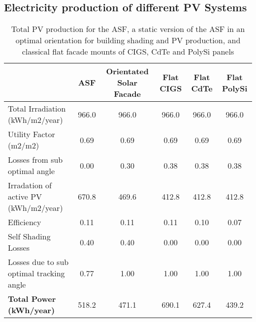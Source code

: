 

\subsection{Electricity production of different PV Systems}
\begin{landscape}
\begin{table}
\begin{tabular}{lccccc}
\hline
                                         &  ASF & Orientated Solar Facade & Flat  CIGS & Flat  CdTe & Flat  PolySi \\
\hline
Total Irradiation (kWh/m2/year)          & 966.0      & 966.0      & 966.0             & 966.0             & 966.0               \\
Utility Factor (m2/m2)                   & 0.69       & 0.69       & 0.69              & 0.69              & 0.69                \\
Losses from sub optimal angle            & 0.00       & 0.30       & 0.38              & 0.38              & 0.38                \\
Irradation of active PV  (kWh/m2/year)   & 670.8      & 469.6      & 412.8             & 412.8             & 412.8               \\
Efficiency                               & 0.11       & 0.11       & 0.11              & 0.10              & 0.07                \\
Self Shading Losses                      & 0.40       & 0.40       & 0.00              & 0.00              & 0.00                \\
Losses due to sub optimal tracking angle & 0.77       & 1.00       & 1.00              & 1.00              & 1.00                \\
\textbf{Total Power (kWh/year)}          & 518.2      & 471.1      & 690.1             & 627.4             & 439.2               \\
\hline
\end{tabular}
\caption{Total PV production for the ASF, a static version of the ASF in an optimal orientation for building shading and PV production, and classical flat facade mounts of CIGS, CdTe and PolySi panels}
\label{tab:PVCalc}
\end{table}

\end{landscape}

